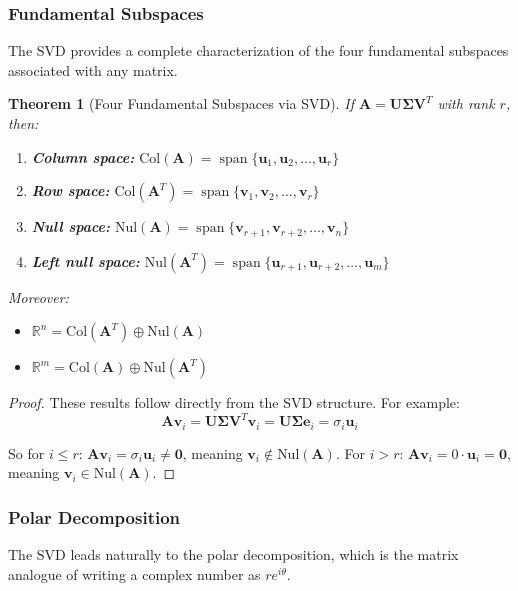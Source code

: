 \documentclass[12pt]{article}
\numberwithin{equation}{section}
\newcommand{\vect}[1]{\boldsymbol{#1}}   %
\newcommand{\mat}[1]{\mathbf{#1}}        %
\newcommand{\Span}{\operatorname{span}}
\theoremstyle{plain}
\newtheorem{theorem}{Theorem}[section]
\theoremstyle{definition}
\theoremstyle{remark}
\begin{document}
\subsubsection{Fundamental Subspaces}

The SVD provides a complete characterization of the four fundamental subspaces associated with any matrix.

\begin{theorem}[Four Fundamental Subspaces via SVD]
If $\mat{A} = \mat{U}\mat{\Sigma}\mat{V}^T$ with rank $r$, then:
\begin{enumerate}
\item \textbf{Column space:} $\text{Col}(\mat{A}) = \Span\{\vect{u}_1, \vect{u}_2, \ldots, \vect{u}_r\}$
\item \textbf{Row space:} $\text{Col}(\mat{A}^T) = \Span\{\vect{v}_1, \vect{v}_2, \ldots, \vect{v}_r\}$
\item \textbf{Null space:} $\text{Nul}(\mat{A}) = \Span\{\vect{v}_{r+1}, \vect{v}_{r+2}, \ldots, \vect{v}_n\}$
\item \textbf{Left null space:} $\text{Nul}(\mat{A}^T) = \Span\{\vect{u}_{r+1}, \vect{u}_{r+2}, \ldots, \vect{u}_m\}$
\end{enumerate}

Moreover:
\begin{itemize}
\item $\mathbb{R}^n = \text{Col}(\mat{A}^T) \oplus \text{Nul}(\mat{A})$
\item $\mathbb{R}^m = \text{Col}(\mat{A}) \oplus \text{Nul}(\mat{A}^T)$
\end{itemize}
\end{theorem}

\begin{proof}
These results follow directly from the SVD structure. For example:
$$\mat{A}\vect{v}_i = \mat{U}\mat{\Sigma}\mat{V}^T\vect{v}_i = \mat{U}\mat{\Sigma}\vect{e}_i = \sigma_i\vect{u}_i$$

So for $i \leq r$: $\mat{A}\vect{v}_i = \sigma_i\vect{u}_i \neq \vect{0}$, meaning $\vect{v}_i \notin \text{Nul}(\mat{A})$.
For $i > r$: $\mat{A}\vect{v}_i = 0 \cdot \vect{u}_i = \vect{0}$, meaning $\vect{v}_i \in \text{Nul}(\mat{A})$.
\end{proof}

\subsubsection{Polar Decomposition}

The SVD leads naturally to the polar decomposition, which is the matrix analogue of writing a complex number as $re^{i\theta}$.
\end{document}

